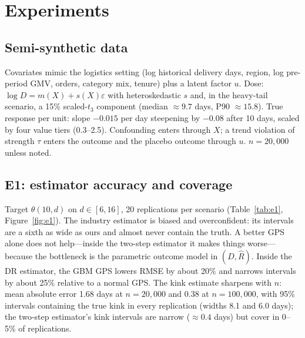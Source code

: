 \documentclass[sigconf,anonymous,review]{acmart}
\begin{document}
\section{Experiments}\label{sec:experiments}

\subsection{Semi-synthetic data}
Covariates mimic the logistics setting (log historical delivery days, region, log pre-period GMV, orders, category mix, tenure) plus a latent factor $u$. Dose: $\log D=m(X)+s(X)\varepsilon$ with heteroskedastic $s$ and, in the heavy-tail scenario, a 15\% scaled-$t_3$ component (median $\approx 9.7$ days, P90 $\approx 15.8$). True response per unit: slope $-0.015$ per day steepening by $-0.08$ after 10 days, scaled by four value tiers (0.3--2.5). Confounding enters through $X$; a trend violation of strength $\tau$ enters the outcome and the placebo outcome through $u$. $n=20{,}000$ unless noted.

\subsection{E1: estimator accuracy and coverage}
Target $\theta(10,d)$ on $d\in[6,16]$, 20 replications per scenario (Table~\ref{tab:e1}, Figure~\ref{fig:e1}). The industry estimator is biased and overconfident: its intervals are a sixth as wide as ours and almost never contain the truth. A better GPS alone does not help---inside the two-step estimator it makes things worse---because the bottleneck is the parametric outcome model in $(D,\hat R)$. Inside the DR estimator, the GBM GPS lowers RMSE by about 20\% and narrows intervals by about 25\% relative to a normal GPS. The kink estimate sharpens with $n$: mean absolute error 1.68 days at $n=20{,}000$ and 0.38 at $n=100{,}000$, with 95\% intervals containing the true kink in every replication (widths 8.1 and 6.0 days); the two-step estimator's kink intervals are narrow ($\approx0.4$ days) but cover in 0--5\% of replications.
\end{document}
